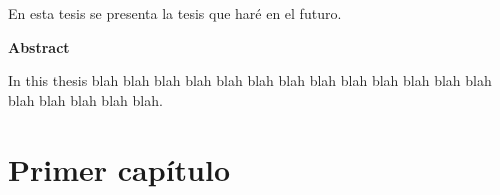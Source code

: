 \documentclass[12pt]{book}
\theoremstyle{definition}
\newcounter{in}
\begin{document}
En esta tesis se presenta la tesis que haré en el futuro.

\vspace{2cm}

\begin{flushleft}
  {\bfseries\Large Abstract}
\end{flushleft}

In this thesis blah blah blah blah blah blah blah blah blah
blah blah blah blah blah blah blah blah blah.



 \newpage \thispagestyle{empty}

\chapter{Primer capítulo}
\label{cha:primer-capitulo}


\backmatter




\printindex
\end{document}
